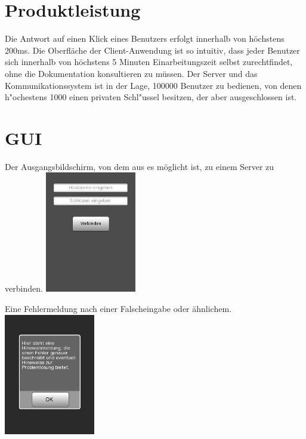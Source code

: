 \documentclass[a4paper,10pt]{scrartcl}
\begin{document}
\section{Produktleistung}

\begin{usecase}
 {Die Antwort auf einen Klick eines Benutzers erfolgt innerhalb von
                höchstens 200ms.}
 {Die Oberfläche der Client-Anwendung ist so intuitiv, dass jeder Benutzer
                sich innerhalb von höchstens 5 Minuten Einarbeitungszeit selbst
                zurechtfindet, ohne die Dokumentation konsultieren zu müssen.}
 {Der Server und das Kommunikationssystem ist in der Lage,
                100000 Benutzer zu bedienen, von denen h"ochestens 1000 einen
                privaten Schl"ussel besitzen, der aber ausgeschlossen ist.}
\end{usecase}

\section{GUI}

\begin{illustration}{Der Ausgangsbildschirm, von dem aus es möglicht ist, zu einem Server zu verbinden.}
\includegraphics[width=150px]{figures/images/homescreen.jpg}
\end{illustration}
\begin{illustration}{Eine Fehlermeldung nach einer Falscheingabe oder ähnlichem.}
\includegraphics[width=150px]{figures/images/alert.jpg}
\end{illustration}
\end{document}
